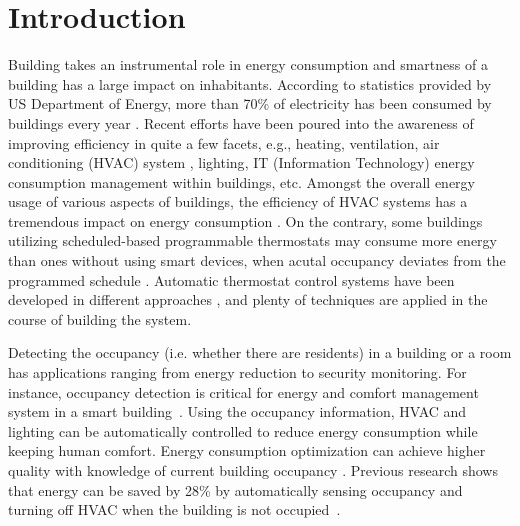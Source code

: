 \section{Introduction}
\label{sec:intro}
Building takes an instrumental role in energy consumption and smartness of a
building has a large impact on inhabitants. \textcolor{feb18rev}{According to
statistics provided by US Department of Energy, more than 70\% of electricity
has been consumed by buildings every year \cite{doe_annual}. Recent efforts
have been poured into the awareness of
improving efficiency in quite a few facets, e.g., heating, ventilation, air
conditioning (HVAC) system \cite{erickson2009energy}\cite{gao2009selfprog},
lighting\cite{delaney2009eval}, IT (Information Technology) energy consumption management within
buildings\cite{agarwal2009augnet}\cite{agarwal2010sleep}, etc.} Amongst the
overall energy usage of various aspects of buildings, the efficiency of HVAC
systems has a tremendous impact on energy consumption \cite{hobby2012analysis}.
\textcolor{feb18rev}{On the contrary, some buildings utilizing scheduled-based
programmable thermostats may consume more energy than ones without using smart
devices, when acutal occupancy deviates from the programmed schedule}
\cite{bias1999elec}. Automatic thermostat control systems have been developed
in different approaches \cite{thomas2012intelligent}\cite{lu2012eval}, and
plenty of techniques are applied in the course of building the system.

Detecting the occupancy (i.e. whether there are residents) in a building or a
room has applications ranging from energy reduction to security monitoring. For
instance, occupancy detection is critical for energy and comfort management
system in a smart building~\cite{Nguyen2013Energy}.  Using the occupancy
information, HVAC and lighting can be automatically controlled to reduce energy
consumption while keeping human comfort. Energy consumption optimization can
achieve higher quality with knowledge of current building occupancy
\cite{majumdar2014energy}. Previous research shows that energy
can be saved by 28\% by automatically sensing occupancy and turning off HVAC
when the building is not occupied~\cite{Lu:SenSys10}.

